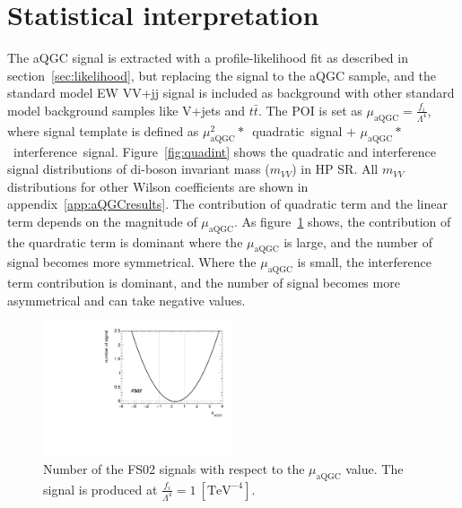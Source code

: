\section{Statistical interpretation}
The aQGC signal is extracted with a profile-likelihood fit as described in section~\ref{sec:likelihood}, but replacing the signal to the aQGC sample, and the standard model EW VV+jj signal is included as background with other standard model background samples like V+jets and $t\bar{t}$.
The POI is set as $\mu_{\mathrm{aQGC}} = \frac{f_i}{\Lambda^4}$, where signal template is defined as $\mu_{\mathrm{aQGC}}^2*$~quadratic~signal $+$ $\mu_{\mathrm{aQGC}}*$~interference~signal.
Figure~\ref{fig:quadint} shows the quadratic and interference signal distributions of di-boson invariant mass ($m_{VV}$) in HP SR.
All $m_{VV}$ distributions for other Wilson coefficients are shown in appendix~\ref{app:aQGCresults}.  
The contribution of quadratic term and the linear term depends on the magnitude of $\mu_\mathrm{aQGC}$.
As figure~\ref{fig:largemu} shows, the contribution of the quardratic term is dominant where the $\mu_\mathrm{aQGC}$ is large, and the number of signal becomes more symmetrical. Where the $\mu_\mathrm{aQGC}$ is small, the interference term contribution is dominant, and the number of signal becomes more asymmetrical and can take negative values.
\begin{figure}[ht]
    \centering
        \includegraphics[width=0.50\textwidth]{figures/aQGC/largemu.pdf}
        \caption{Number of the FS02 signals with respect to the $\mu_\mathrm{aQGC}$ value. The signal is produced at $\frac{f_i}{\Lambda^4} = 1~[\mathrm{TeV}^{-4}]$. }
        \label{fig:largemu}
\end{figure}
